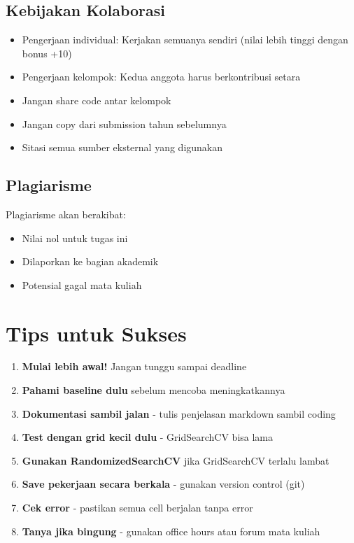 \documentclass[12pt,a4paper]{article}
\begin{document}
\subsection{Kebijakan Kolaborasi}
\begin{itemize}
    \item Pengerjaan individual: Kerjakan semuanya sendiri (nilai lebih tinggi dengan bonus +10)
    \item Pengerjaan kelompok: Kedua anggota harus berkontribusi setara
    \item Jangan share code antar kelompok
    \item Jangan copy dari submission tahun sebelumnya
    \item Sitasi semua sumber eksternal yang digunakan
\end{itemize}

\subsection{Plagiarisme}
Plagiarisme akan berakibat:
\begin{itemize}
    \item Nilai nol untuk tugas ini
    \item Dilaporkan ke bagian akademik
    \item Potensial gagal mata kuliah
\end{itemize}

\section{Tips untuk Sukses}

\begin{enumerate}
    \item \textbf{Mulai lebih awal!} Jangan tunggu sampai deadline
    \item \textbf{Pahami baseline dulu} sebelum mencoba meningkatkannya
    \item \textbf{Dokumentasi sambil jalan} - tulis penjelasan markdown sambil coding
    \item \textbf{Test dengan grid kecil dulu} - GridSearchCV bisa lama
    \item \textbf{Gunakan RandomizedSearchCV} jika GridSearchCV terlalu lambat
    \item \textbf{Save pekerjaan secara berkala} - gunakan version control (git)
    \item \textbf{Cek error} - pastikan semua cell berjalan tanpa error
    \item \textbf{Tanya jika bingung} - gunakan office hours atau forum mata kuliah
\end{enumerate}
\end{document}
